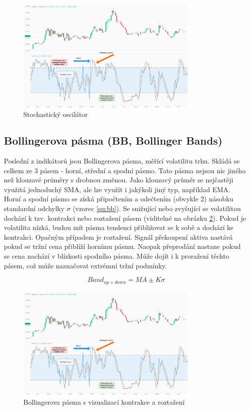 \begin{figure}[ht]
    \centering
    \includegraphics[width=0.8\textwidth]{Figures/Stoch.pdf}
    \caption{Stochastický oscilátor}
    \label{fig:stoch}
\end{figure}

\subsection{Bollingerova pásma (BB, Bollinger Bands)}
Poslední z indikátorů jsou Bollingerova pásma, měřící volatilitu trhu. Skládá se celkem ze 3 pásem - horní, střední a spodní pásmo. Tato pásma nejsou nic jiného než klouzavé průměry
s drobnou změnou. Jako klouzavý průměr se nejčastěji využitá jednoduchý SMA, ale lze využít i jakýkoli jiný typ, například EMA. Horní a spodní pásmo se získá připočtením a odečtením
(obvykle 2) násobku standardní odchylky $\sigma$ (vzorec \ref{eq:bb}). Se snižující nebo zvyšující se volatilitou dochází k tzv. kontrakci nebo roztažení pásem (viditelné na obrázku \ref{fig:bb}).
Pokud je volatilita nízká, budou mít
pásma tendenci přibližovat se k sobě a dochází ke kontrakci. Opačným případem je roztažení. Signál překoupení aktiva nastává pokud se tržní cena přiblíží hornímu pásmu. Naopak přeprodání
nastane pokud se cena nachází v blízkosti spodního pásma. Může dojít i k proražení těchto pásem, což může naznačovat extrémní tržní podmínky.

\begin{equation}
    Band_{up + down} = MA \pm K\sigma
    \label{eq:bb}
\end{equation}

\begin{figure}[ht]
    \centering
    \includegraphics[width=0.8\textwidth]{Figures/Stoch.pdf}
    \caption{Bollingerova pásma s vizualizací kontrakce a roztažení}
    \label{fig:bb}
\end{figure}


\endinput